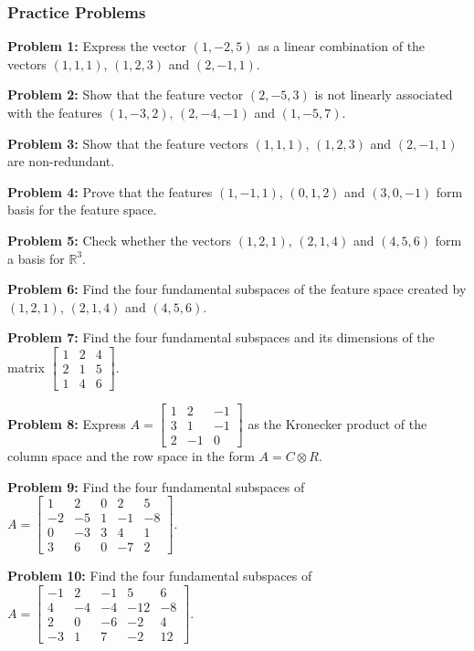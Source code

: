 \documentclass[
  letterpaper,
  DIV=11,
  numbers=noendperiod]{scrreprt}
\theoremstyle{plain}
\theoremstyle{definition}
\theoremstyle{remark}
\begin{document}
\subsubsection*{Practice Problems}\label{practice-problems-4}

\textbf{Problem 1:} Express the vector \((1,-2,5)\) as a linear
combination of the vectors \((1,1,1)\), \((1,2,3)\) and \((2,-1,1)\).

\textbf{Problem 2:} Show that the feature vector \((2,-5,3)\) is not
linearly associated with the features \((1,-3,2)\), \((2,-4,-1)\) and
\((1,-5,7)\).

\textbf{Problem 3:} Show that the feature vectors \((1,1,1)\),
\((1,2,3)\) and \((2,-1,1)\) are non-redundant.

\textbf{Problem 4:} Prove that the features \((1,-1,1)\), \((0,1,2)\)
and \((3,0,-1)\) form basis for the feature space.

\textbf{Problem 5:} Check whether the vectors \((1,2,1)\), \((2,1,4)\)
and \((4,5,6)\) form a basis for \(\mathbb{R}^3\).

\textbf{Problem 6:} Find the four fundamental subspaces of the feature
space created by \((1,2,1)\), \((2,1,4)\) and \((4,5,6)\).

\textbf{Problem 7:} Find the four fundamental subspaces and its
dimensions of the matrix
\(\begin{bmatrix}1&2&4\\2&1&5\\1&4&6\end{bmatrix}\).

\textbf{Problem 8:} Express
\(A=\begin{bmatrix}1&2&-1\\3&1&-1\\2&-1&0\end{bmatrix}\) as the
Kronecker product of the column space and the row space in the form
\(A=C\otimes R\).

\textbf{Problem 9:} Find the four fundamental subspaces of
\(A=\begin{bmatrix} 1&2&0&2&5\\-2&-5&1&-1&-8\\0&-3&3&4&1\\3&6&0&-7&2\end{bmatrix}\).

\textbf{Problem 10:} Find the four fundamental subspaces of
\(A=\begin{bmatrix}-1&2&-1&5&6\\4&-4&-4&-12&-8\\2&0&-6&-2&4\\-3&1&7&-2&12\end{bmatrix}\).
\end{document}
